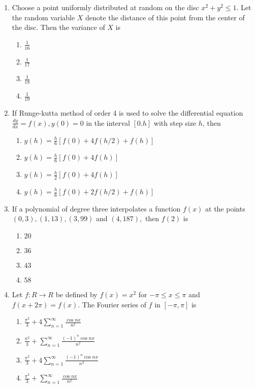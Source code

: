 \documentclass[journal,12pt,onecolumn]{IEEEtran}
\theoremstyle{remark}
\begin{document}
\begin{enumerate}
\item Choose a point uniformly distributed at random on the disc $x^2+y^2\leq1$. Let the random variable $X$ denote the distance of this point from the center of the disc. Then the variance of $X$ is 
\begin{enumerate}
    \item $\frac{1}{16}$
    \item $\frac{1}{17}$
    \item $\frac{1}{18}$
    \item $\frac{1}{19}$ \\
\end{enumerate}
    
\item If Runge-kutta method of order 4 is used to solve the differential equation $\frac{dy}{dx}=f(x),y(0)=0$ in the interval $[0.h]$ with step size $h$, then 
\begin{enumerate}
    \item $y(h)=\frac{h}{6}[f(0)+4f(h/2)+f(h)]$
    \item $y(h)=\frac{h}{6}[f(0)+4f(h)]$
    \item $y(h)=\frac{h}{2}[f(0)+4f(h)]$
    \item $y(h)=\frac{h}{6}[f(0)+2f(h/2)+f(h)]$ \\
\end{enumerate}

\item If a polynomial of degree three interpolates a function $f(x)$ at the points $(0, 3), (1,13),(3,99)$ and $(4,187),$ then $f(2)$ is 
\begin{enumerate}
    \item $20$
    \item $36$
    \item $43$
    \item $58$ \\
\end{enumerate}

\item Let $f:R\rightarrow R$ be defined by $f(x)=x^2$ for $-\pi \leq x \leq \pi$ and $f(x+2\pi)=f(x).$ 
The Fourier series of $f$ in $[-\pi,\pi]$ is 
\begin{enumerate}
    \item $\frac{\pi^2}{3}+4\sum_{n=1}^\infty \frac{\cos nx}{n^2}$
    \item $\frac{\pi^2}{3}+\sum_{n=1}^\infty \frac{(-1)^n \cos nx}{n^2}$
    \item $\frac{\pi^2}{3}+4\sum_{n=1}^\infty \frac{(-1)^n \cos nx}{n^2}$
    \item $\frac{\pi^2}{3}+\sum_{n=1}^\infty \frac{\cos nx}{n^2}$ \\
\end{enumerate}



\end{enumerate}
\end{document}
